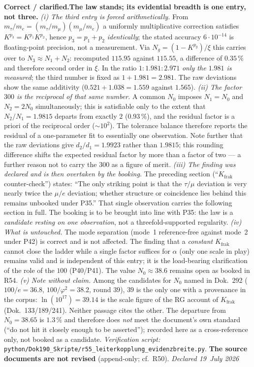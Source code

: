 \smallskip\noindent\textbf{Correct / clarified.}\quad \textbf{The law stands; its evidential breadth is one entry, not three.} \emph{(i) The third entry is forced arithmetically.} From $m_\tau/m_e=(m_\tau/m_\mu)(m_\mu/m_e)$ a uniformly multiplicative correction satisfies $K^{p_3}=K^{p_1}K^{p_2}$, hence $p_3=p_1+p_2$ \emph{identically}; the stated accuracy $6\cdot10^{-14}$ is floating-point precision, not a measurement. Via $N_g=(1-K^{p_g})/\xi$ this carries over to $N_3\approx N_1+N_2$: recomputed $115.95$ against $115.55$, a difference of $0.35\,\%$ and therefore second order in $\xi$. In the ratio $1{:}1.981{:}2.971$ \emph{only the $1.981$ is measured}; the third number is fixed as $1+1.981=2.981$. The raw deviations show the same additivity ($0.521+1.038=1.559$ against $1.565$). \emph{(ii) The factor $300$ is the reciprocal of that same number.} A common $N_0$ imposes $N_1=N_0$ and $N_2=2N_0$ simultaneously; this is satisfiable only to the extent that $N_2/N_1=1.9815$ departs from exactly $2$ ($0.93\,\%$), and the residual factor is a priori of the reciprocal order ($\sim10^2$). The tolerance balance therefore reports the residual of a one-parameter fit to essentially one observation. Note further that the raw deviations give $d_2/d_1=1.9923$ rather than $1.9815$; this rounding difference shifts the expected residual factor by more than a factor of two --- a further reason not to carry the $300$ as a figure of merit. \emph{(iii) The finding was declared and is then overtaken by the booking.} The preceding section (\enquote{$K_{\text{frak}}$ counter-check}) states: \enquote{The only striking point is that the $\tau/\mu$ deviation is very nearly twice the $\mu/e$ deviation; whether structure or coincidence lies behind this remains unbooked under P35.} That single observation carries the following section in full. The booking is to be brought into line with P35: the law is a \emph{candidate resting on one observation}, not a threefold-supported regularity. \emph{(iv) What is untouched.} The mode separation (mode~1 reference-free against mode~2 under P42) is correct and is not affected. The finding that a \emph{constant} $K_{\text{frak}}$ cannot close the ladder while a single factor suffices for $\alpha$ (only one scale in play) remains valid and is independent of this entry; it is the load-bearing clarification of the role of the $100$ (P40/P41). The value $N_0\approx38.6$ remains open as booked in R54. \emph{(v) Note without claim.} Among the candidates for $N_0$ named in Dok.~292 ($100/e=36.8$, $100/\varphi^2=38.2$, round $39$), $39$ is the only one with a provenance in the corpus: $\ln(10^{17})=39.14$ is the scale figure of the RG account of $K_{\text{frak}}$ (Dok.~133/189/241). Neither passage cites the other. The departure from $N_0=38.65$ is $1.3\,\%$ and therefore does \emph{not} meet the document's own standard (\enquote{do not hit it closely enough to be asserted}); recorded here as a cross-reference only, not booked as a candidate. \emph{Verification script:} \texttt{python/Dok190\_Skripte/r55\_leiterkopplung\_evidenzbreite.py}. \textbf{The source documents are not revised} (append-only; cf.\ R50). \emph{Declared 19~July 2026}


